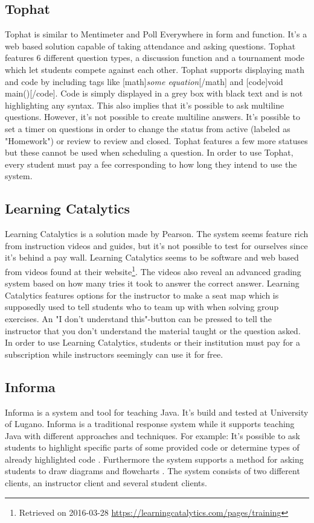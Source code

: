 \subsection*{Tophat}
Tophat is similar to Mentimeter and Poll Everywhere in form and function. It's a web based solution capable of taking attendance and asking questions. Tophat features 6 different question types, a discussion function and a tournament mode which let students compete against each other. Tophat supports displaying math and code by including tags like [math]\emph{some equation}[/math] and [code]void main()[/code]. Code is simply displayed in a grey box with black text and is not highlighting any syntax. This also implies that it's possible to ask multiline questions. However, it's not possible to create multiline answers. It's possible to set a timer on questions in order to change the status from active (labeled as "Homework") or review to review and closed. Tophat features a few more statuses but these cannot be used when scheduling a question. In order to use Tophat, every student must pay a fee corresponding to how long they intend to use the system.

\subsection*{Learning Catalytics}
Learning Catalytics is a solution made by Pearson. The system seems feature rich from instruction videos and guides, but it's not possible to test for ourselves since it's behind a pay wall. Learning Catalytics seems to be software and web based from videos found at their website\footnote{Retrieved on 2016-03-28 \url{https://learningcatalytics.com/pages/training}}. The videos also reveal an advanced grading system based on how many tries it took to answer the correct answer. Learning Catalytics features options for the instructor to make a seat map which is supposedly used to tell students who to team up with when solving group exercises. An "I don't understand this"-button can be pressed to tell the instructor that you don't understand the material taught or the question asked. In order to use Learning Catalytics, students or their institution must pay for a subscription while instructors seemingly can use it for free.

\subsection*{Informa}
Informa is a system and tool for teaching Java. It's build and tested at University of Lugano. Informa is a traditional response system while it supports teaching Java with different approaches and techniques. For example: It's possible to ask students to highlight specific parts of some provided code or determine types of already highlighted code \cite[p.~2]{Hauswirth09}. Furthermore the system supports a method for asking students to draw diagrams and flowcharts \cite[p.~3]{Hauswirth09}. 
The system consists of two different clients, an instructor client and several student clients. 

